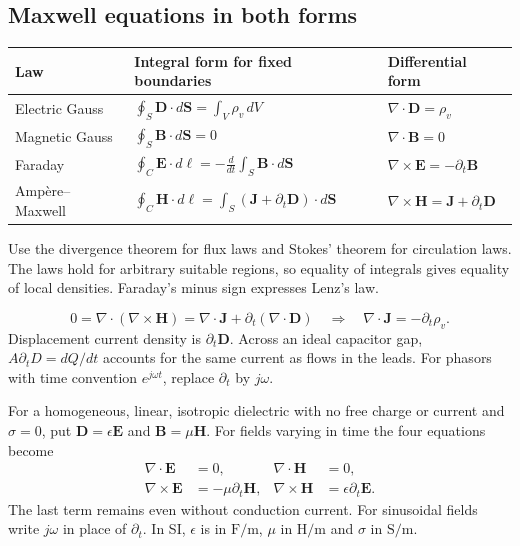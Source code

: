 \documentclass[12pt,a4paper]{article}
\begin{document}
\subsection{Maxwell equations in both forms}
\par\vspace{6pt}\noindent
\begin{tabularx}{\linewidth}{|B{3.3cm}|Y|Y|}\hline
Law & Integral form for fixed boundaries & Differential form \\ \hline
Electric Gauss & $\oint_S\mathbf D\cdot d\mathbf S=\int_V\rho_v\,dV$ & $\nabla\cdot\mathbf D=\rho_v$ \\ \hline
Magnetic Gauss & $\oint_S\mathbf B\cdot d\mathbf S=0$ & $\nabla\cdot\mathbf B=0$ \\ \hline
Faraday & $\oint_C\mathbf E\cdot d\boldsymbol\ell=-\frac{d}{dt}\int_S\mathbf B\cdot d\mathbf S$ & $\nabla\times\mathbf E=-\partial_t\mathbf B$ \\ \hline
Amp\`ere--Maxwell & $\oint_C\mathbf H\cdot d\boldsymbol\ell=\int_S(\mathbf J+\partial_t\mathbf D)\cdot d\mathbf S$ & $\nabla\times\mathbf H=\mathbf J+\partial_t\mathbf D$ \\ \hline
\end{tabularx}

Use the divergence theorem for flux laws and Stokes' theorem for circulation laws. The laws hold for arbitrary suitable regions, so equality of integrals gives equality of local densities. Faraday's minus sign expresses Lenz's law.
\begin{tcolorbox}[formulabox,title={Charge conservation and displacement current}]
\[
0=\nabla\cdot(\nabla\times\mathbf H)
 =\nabla\cdot\mathbf J+\partial_t(\nabla\cdot\mathbf D)
 \quad\Longrightarrow\quad \nabla\cdot\mathbf J=-\partial_t\rho_v .
\]
Displacement current density is $\partial_t\mathbf D$. Across an ideal capacitor gap, $A\partial_t D=dQ/dt$ accounts for the same current as flows in the leads. For phasors with time convention $e^{j\omega t}$, replace $\partial_t$ by $j\omega$.
\end{tcolorbox}

\begin{tcolorbox}[formulabox,title={Maxwell equations in a source-free lossless medium}]
For a homogeneous, linear, isotropic dielectric with no free charge or current and $\sigma=0$, put $\mathbf D=\epsilon\mathbf E$ and $\mathbf B=\mu\mathbf H$. For fields varying in time the four equations become
\[
\begin{aligned}
 \nabla\cdot\mathbf E&=0,& \nabla\cdot\mathbf H&=0,\\
 \nabla\times\mathbf E&=-\mu\partial_t\mathbf H,&
 \nabla\times\mathbf H&=\epsilon\partial_t\mathbf E .
\end{aligned}
\]
The last term remains even without conduction current. For sinusoidal fields write $j\omega$ in place of $\partial_t$. In SI, $\epsilon$ is in $\mathrm{F/m}$, $\mu$ in $\mathrm{H/m}$ and $\sigma$ in $\mathrm{S/m}$.
\end{tcolorbox}
\end{document}
